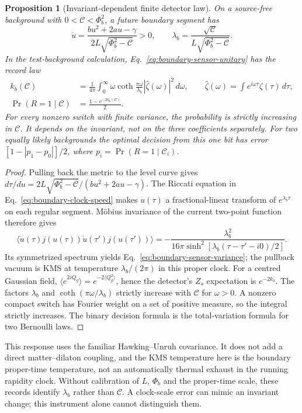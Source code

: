 \documentclass[12pt,a4paper]{article}
\newtheorem{proposition}[theorem]{Proposition}
\begin{document}
\begin{proposition}[Invariant-dependent finite detector law]
\label{prop:boundary-sensor-law}
On a source-free background with $0<\mathcal C<\Phi_b^2$, a future boundary
segment has
\begin{equation}\label{eq:boundary-clock-speed}
 \dot u=\frac{bu^2+2au-\gamma}{2L\sqrt{\Phi_b^2-\mathcal C}}>0,
 \qquad
 \lambda_b=\frac{\sqrt{\mathcal C}}{L\sqrt{\Phi_b^2-\mathcal C}}.
\end{equation}
In the test-background calculation, Eq.~\eqref{eq:boundary-sensor-unitary}
has the record law
\begin{align}
 k_b(\mathcal C)&=\frac{1}{4\pi}\int_0^\infty
  \omega\coth\frac{\pi\omega}{\lambda_b}
  |\widehat\zeta(\omega)|^2\,d\omega,
 \qquad \widehat\zeta(\omega)=\int e^{i\omega\tau}\zeta(\tau)\,d\tau,
 \label{eq:boundary-sensor-variance}\\
 \Pr(R=1\mid\mathcal C)&=\frac{1-e^{-2k_b(\mathcal C)}}2.
 \label{eq:boundary-sensor-record}
\end{align}
For every nonzero switch with finite variance, the probability is strictly
increasing in $\mathcal C$. It depends on the invariant, not on the three
coefficients separately. For two equally likely backgrounds the optimal
decision from this one bit has error
$[1-|p_1-p_0|]/2$, where $p_i=\Pr(R=1\mid\mathcal C_i)$.
\end{proposition}
\begin{proof}
Pulling back the metric to the level curve gives
$d\tau/du=2L\sqrt{\Phi_b^2-\mathcal C}/(bu^2+2au-\gamma)$.
The Riccati equation in Eq.~\eqref{eq:boundary-clock-speed} makes $u(\tau)$
a fractional-linear transform of $e^{\lambda_b\tau}$ on each regular segment.
M\"obius invariance of the current two-point function therefore gives
\[
 \langle\dot u(\tau)j(u(\tau))\dot u(\tau')j(u(\tau'))\rangle
 =-\frac{\lambda_b^2}{16\pi
       \sinh^2[\lambda_b(\tau-\tau'-i0)/2]}.
\]
Its symmetrized spectrum yields Eq.~\eqref{eq:boundary-sensor-variance}; the
pullback vacuum is KMS at temperature $\lambda_b/(2\pi)$ in this proper clock.
For a centred Gaussian field,
$\langle e^{2iQ_g}\rangle=e^{-2\langle Q_g^2\rangle}$, hence the detector's
$Z_s$ expectation is $e^{-2k_b}$. The factors $\lambda_b$ and
$\coth(\pi\omega/\lambda_b)$ strictly increase with $\mathcal C$ for
$\omega>0$. A nonzero compact switch has Fourier weight on a set of positive
measure, so the integral strictly increases. The binary decision formula is
the total-variation formula for two Bernoulli laws.
\end{proof}
This response uses the familiar Hawking--Unruh covariance. It does not add a
direct matter--dilaton coupling, and the KMS temperature here is the boundary
proper-time temperature, not an automatically thermal exhaust in the running
rapidity clock.
Without calibration of $L$, $\Phi_b$ and the proper-time scale, these records
identify $\lambda_b$ rather than $\mathcal C$. A clock-scale error can mimic
an invariant change; this instrument alone cannot distinguish them.
\end{document}
